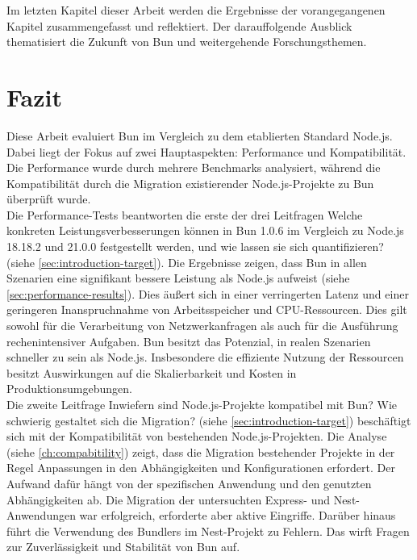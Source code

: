  \label{ch:finalThoughts}
Im letzten Kapitel dieser Arbeit werden die Ergebnisse der vorangegangenen Kapitel zusammengefasst und reflektiert. Der darauffolgende Ausblick thematisiert die Zukunft von Bun und weitergehende Forschungsthemen.

\section{Fazit} \label{sec:finalThoughts-conclusion}
Diese Arbeit evaluiert Bun im Vergleich zu dem etablierten Standard Node.js. Dabei liegt der Fokus auf zwei Hauptaspekten: Performance und Kompatibilität. Die Performance wurde durch mehrere Benchmarks analysiert, während die Kompatibilität durch die Migration existierender Node.js-Projekte zu Bun überprüft wurde.\\

\noindent
Die Performance-Tests beantworten die erste der drei Leitfragen \glqq Welche konkreten Leistungsverbesserungen können in Bun 1.0.6 im Vergleich zu Node.js 18.18.2 und 21.0.0 festgestellt werden, und wie lassen sie sich quantifizieren?\grqq{} (siehe \autoref{sec:introduction-target}). Die Ergebnisse zeigen, dass Bun in allen Szenarien eine signifikant bessere Leistung als Node.js aufweist (siehe \autoref{sec:performance-results}). Dies äußert sich in einer verringerten Latenz und einer geringeren Inanspruchnahme von Arbeitsspeicher und CPU-Ressourcen. Dies gilt sowohl für die Verarbeitung von Netzwerkanfragen als auch für die Ausführung rechenintensiver Aufgaben. Bun besitzt das Potenzial, in realen Szenarien schneller zu sein als Node.js. Insbesondere die effiziente Nutzung der Ressourcen besitzt Auswirkungen auf die Skalierbarkeit und Kosten in Produktionsumgebungen.\\

\noindent
Die zweite Leitfrage  \glqq Inwiefern sind Node.js-Projekte kompatibel mit Bun? Wie schwierig gestaltet sich die Migration?\grqq{} (siehe \autoref{sec:introduction-target}) beschäftigt sich mit der Kompatibilität von bestehenden Node.js-Projekten. Die Analyse (siehe \autoref{ch:compabitility}) zeigt, dass die Migration bestehender Projekte in der Regel Anpassungen in den Abhängigkeiten und Konfigurationen erfordert. Der Aufwand dafür hängt von der spezifischen Anwendung und den genutzten Abhängigkeiten ab. Die Migration der untersuchten Express- und Nest-Anwendungen war erfolgreich, erforderte aber aktive Eingriffe. Darüber hinaus führt die Verwendung des Bundlers im Nest-Projekt zu Fehlern. Das wirft Fragen zur Zuverlässigkeit und Stabilität von Bun auf.\\

